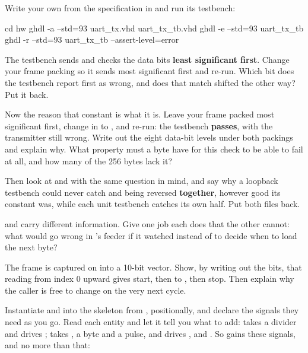 \label{c2:ex:2}

 Write your own  from the specification in  and
run its testbench:

\begin{shell}
cd hw
ghdl -a --std=93 uart_tx.vhd uart_tx_tb.vhd
ghdl -e --std=93 uart_tx_tb
ghdl -r --std=93 uart_tx_tb --assert-level=error
\end{shell}

 The testbench sends  and checks the data bits \textbf{least significant
first}. Change your frame packing so it sends most significant first and re-run. Which bit does the
testbench report first as wrong, and does that match  shifted the other way?
Put it back.

 Now the reason that constant is what it is. Leave your frame packed most significant
first, change  in  to , and re-run: the testbench
\textbf{passes}, with the transmitter still wrong. Write out the eight data-bit levels under both
packings and explain why. What property must a byte have for this check to be able to fail at all,
and how many of the 256 bytes lack it?

Then look at  and  with the same question in mind, and say why a
loopback testbench could never catch  and  being reversed
\textbf{together}, however good its constant was, while each unit testbench catches its own half.
Put both files back.

  and  carry different information. Give one job each does that the
other cannot: what would go wrong in 's feeder if it watched  instead of
 to decide when to load the next byte?

 The frame is captured on  into a 10-bit vector. Show, by writing out the bits,
that reading  from index 0 upward gives start, then  to
, then stop. Then explain why the caller is free to change  on the very
next cycle.

 Instantiate  and  into the  skeleton from
, positionally, and declare the signals they need as you go. Read each entity and let it
tell you what to add:  takes a  divider and drives ;
 takes , a byte and a  pulse, and drives ,
 and . So  gains these signals, and no more than that:

